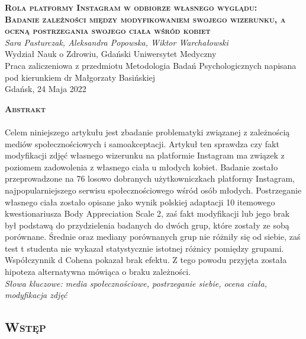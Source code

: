 \documentclass[12pt,a4paper,final,oneside,onecolumn,titlepage]{article}
\begin{document}
\pagestyle{fancy}
\fancyhead{}
\fancyfoot{}
\rhead{\thepage}

\begin{titlepage}
  \thispagestyle{empty}
  \rhead{\thepage}
  \begin{center}
  \vspace*{1cm}
  \Large
  \textbf{\textsc{Rola platformy Instagram w odbiorze własnego wyglądu:\\ Badanie zależności między modyfikowaniem swojego wizerunku, a oceną postrzegania swojego ciała wśród kobiet\\}}
  \vspace{1.5cm}
  \textit{Sara Pasturczak, Aleksandra Popowska, Wiktor Warchałowski\\}
  Wydział Nauk o Zdrowiu, Gdański Uniwersytet Medyczny\\
  \vspace{3cm}
  Praca zaliczeniowa z przedmiotu Metodologia Badań Psychologicznych napisana pod kierunkiem dr Małgorzaty Basińskiej\\
  \vspace{3cm}
  Gdańsk, 24 Maja 2022
  \end{center}
\end{titlepage}
\begin{center}
  \vspace*{0.5cm}
  \large{\textbf{\textsc{Abstrakt}}}
\end{center}
\paragraph{}
Celem niniejszego artykułu jest zbadanie problematyki związanej z zależnością mediów społecznościowych i samoakceptacji. Artykuł ten sprawdza czy fakt modyfikacji zdjęć własnego wizerunku na platformie Instagram ma związek z poziomem zadowolenia z własnego ciała u młodych kobiet. Badanie zostało przeprowadzone na 76 losowo dobranych użytkowniczkach platformy Instagram, najpopularniejszego serwisu społecznościowego wśród osób młodych. Postrzeganie własnego ciała zostało opisane jako wynik polskiej adaptacji 10 itemowego kwestionariusza Body Appreciation Scale 2, zaś fakt modyfikacji lub jego brak był podstawą do przydzielenia badanych do dwóch grup, które zostały ze sobą porównane. Średnie oraz mediany porównanych grup nie różniły się od siebie, zaś test t studenta nie wykazał statystycznie istotnej różnicy pomiędzy grupami. Współczynnik d Cohena pokazał brak efektu. Z tego powodu przyjęta została hipoteza alternatywna mówiąca o braku zależności.\\
\textit{Słowa kluczowe: media społecznościowe, postrzeganie siebie, ocena ciała, modyfikacja zdjęć}
\newpage
\begin{center}
\section*{\large{\textbf{\textsc{Wstęp}}}}
\end{center}
\end{document}
